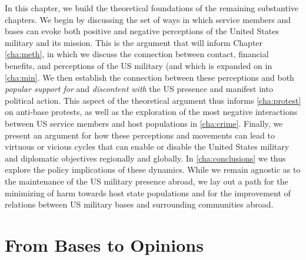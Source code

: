{	In this chapter, we build the theoretical foundations of the remaining substantive chapters. We begin by discussing the set of ways in which service members and bases can evoke both positive and negative perceptions of the United States military and its mission. This is the argument that will inform Chapter \ref{cha:meth}, in which we discuss the connection between contact, financial benefits, and perceptions of the US military (and which is expanded on in \ref{cha:min}.  We then establish the connection between these perceptions and both \textit{popular support for} and \textit{\textit{discontent with}} the US presence and manifest into political action. This aspect of the theoretical argument thus informs \ref{cha:protest} on anti-base protests, as well as the exploration of the most negative interactions between US service members and host populations in \ref{cha:crime}. Finally, we present an argument for how these perceptions and movements can lead to virtuous or vicious cycles that can enable or disable the United States military and diplomatic objectives regionally and globally. In \ref{cha:conclusions} we thus explore the policy implications of these dynamics. While we remain agnostic as to the maintenance of the US military presence abroad, we lay out a path for the minimizing of harm towards host state populations and for the improvement of relations between US military bases and surrounding communities abroad.  
	
	
\section*{From Bases to Opinions}

}
